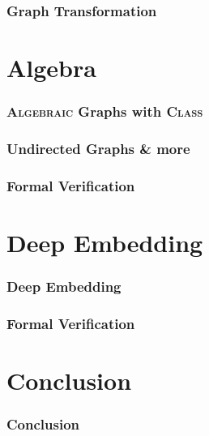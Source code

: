 \documentclass{beamer}
\begin{document}
\begin{frame}
  \frametitle{Graph Transformation}
  
\end{frame}

\section{Algebra}
\begin{frame}
  \frametitle{\textsc{Algebraic} Graphs with \textsc{Class}}
\end{frame}

\begin{frame}
  \frametitle{Undirected Graphs \& more}
  
\end{frame}

\begin{frame}
  \frametitle{Formal Verification}
  
\end{frame}

\section{Deep Embedding}
\begin{frame}
  \frametitle{Deep Embedding}
  
\end{frame}

\begin{frame}
  \frametitle{Formal Verification}
  
\end{frame}

\section{Conclusion}
\begin{frame}
  \frametitle{Conclusion}
  
\end{frame}
\end{document}
